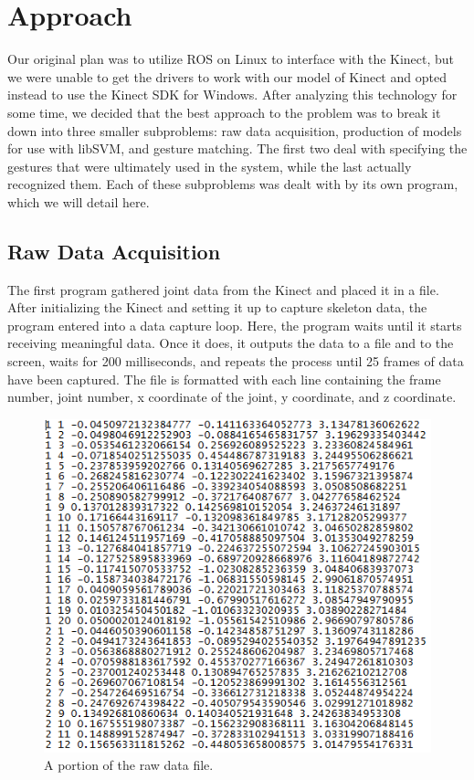 \documentclass[11pt,conference]{IEEEtran}
\begin{document}
\section{Approach}
Our original plan was to utilize ROS on Linux to interface with the Kinect, but we were unable to get the drivers to work with our model of Kinect and opted instead to use the Kinect SDK for Windows. After analyzing this technology for some time, we decided that the best approach to the problem was to break it down into three smaller subproblems: raw data acquisition, production of models for use with libSVM, and gesture matching. The first two deal with specifying the gestures that were ultimately used in the system, while the last actually recognized them. Each of these subproblems was dealt with by its own program, which we will detail here.
\subsection{Raw Data Acquisition}
The first program gathered joint data from the Kinect and placed it in a file. After initializing the Kinect and setting it up to capture skeleton data, the program entered into a data capture loop. Here, the program waits until it starts receiving meaningful data. Once it does, it outputs the data to a file and to the screen, waits for 200 milliseconds, and repeats the process until 25 frames of data have been captured. The file is formatted with each line containing the frame number, joint number, x coordinate of the joint, y coordinate, and z coordinate.

\begin{figure}[h]
\caption{A portion of the raw data file.}
\centering
\includegraphics[width=\linewidth]{raw_data}
\end{figure}
\end{document}
